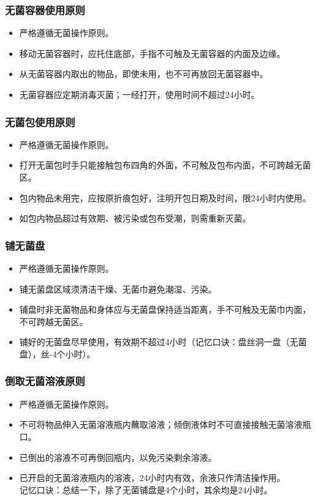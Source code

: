 \documentclass[11pt, a4paper]{ctexart}
\begin{document}
\subsubsection{无菌容器使用原则}
\begin{itemize}
    \item 严格遵循无菌操作原则。
    \item 移动无菌容器时，应托住底部，手指不可触及无菌容器的内面及边缘。
    \item 从无菌容器内取出的物品，即使未用，也不可再放回无菌容器中。
    \item 无菌容器应定期消毒灭菌；一经打开，使用时间不超过24小时。
\end{itemize}

\subsubsection{无菌包使用原则}
\begin{itemize}
    \item 严格遵循无菌操作原则。
    \item 打开无菌包时手只能接触包布四角的外面，不可触及包布内面，不可跨越无菌区。
    \item 包内物品未用完，应按原折痕包好，注明开包日期及时间，限24小时内使用。
    \item 如包内物品超过有效期、被污染或包布受潮，则需重新灭菌。
\end{itemize}

\subsubsection{铺无菌盘}
\begin{itemize}
    \item 严格遵循无菌操作原则。
    \item 铺无菌盘区域须清洁干燥、无菌巾避免潮湿、污染。
    \item 铺盘时非无菌物品和身体应与无菌盘保持适当距离，手不可触及无菌巾内面，不可跨越无菌区。
    \item 铺好的无菌盘尽早使用，有效期不超过4小时（记忆口诀：盘丝洞一盘（无菌盘），丝-4个小时）。
\end{itemize}

\subsubsection{倒取无菌溶液原则}
\begin{itemize}
    \item 严格遵循无菌操作原则。
    \item 不可将物品伸入无菌溶液瓶内蘸取溶液；倾倒液体时不可直接接触无菌溶液瓶口。
    \item 已倒出的溶液不可再倒回瓶内，以免污染剩余溶液。
    \item 已开启的无菌溶液瓶内的溶液，24小时内有效，余液只作清洁操作用。\\
    记忆口诀：总结一下，除了无菌铺盘是4个小时，其余均是24小时。
\end{itemize}
\end{document}
